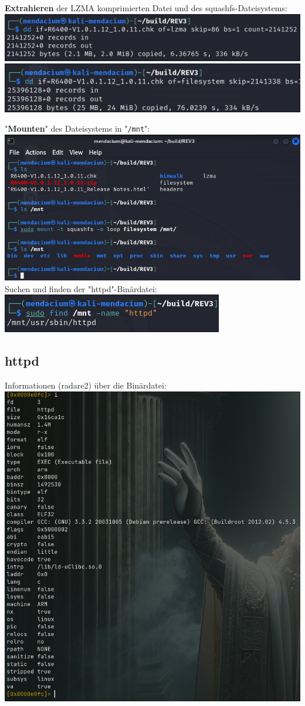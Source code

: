 \documentclass{article}
\begin{document}
	\noindent\textbf{Extrahieren} der LZMA komprimierten Datei und des squashfs-Dateisystems:\\
	\includegraphics[width=0.4\linewidth]{"pictures/1.3 extract lzma.png"}
	\includegraphics[width=0.4\linewidth]{"pictures/1.4 extract filesystem.png"}\\
	
	\pagebreak
	
	\noindent"\textbf{Mounten}" des Dateisystems in "\texttt{/mnt}":\\
	\includegraphics[width=0.4\linewidth]{"pictures/1.5 mount squashfs.png"}\\
	Suchen und finden der "httpd"-Binärdatei:\\
	\includegraphics[width=0.4\linewidth]{"pictures/1.6 find httpd.png"}\\

	\subsection*{httpd}
	Informationen (radare2) über die Binärdatei:\\
	\includegraphics[width=0.4\linewidth]{"pictures/1.7 architecture, entry point.png"}\\
	
	\label{LastPage}
	
\end{document}
